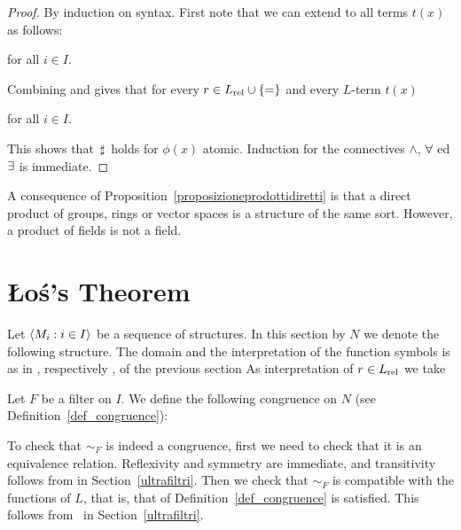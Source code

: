 \documentclass[creche.tex]{subfiles}
\begin{document}
\begin{proof}
By induction on syntax. First note that we can extend  to all terms $t(x)$ as follows:

\hfill  for all $i\in I$. 

Combining  and  gives that for every $r\in L_{\rm rel}\cup\{=\}$ and every $L$-term $t(x)$

\hfill  for all $i\in I$.

This shows that $\,\sharp\,$ holds for $\phi(x)$ atomic. Induction for the connectives $\wedge$, $\forall$ ed $\exists$ is immediate.
\end{proof}

A consequence of Proposition~\ref{proposizioneprodottidiretti} is that a direct product of groups, rings or vector spaces is a structure of the same sort. However, a product of fields is not a field.

\section{\L o\'{s}'s Theorem}
Let $\langle M_i:i\in I\rangle$ be a sequence of structures.
In this section by $N$ we denote the following structure.
The domain and the interpretation of the function symbols is as in , respectively , of the previous section
As interpretation of $r\in L_{\rm rel}$ we take


Let $F$ be a filter on $I$. We define the following congruence on $N$ (see Definition~\ref{def_congruence}):


To check that $\sim_F$ is indeed a congruence, first we need to check that it is an equivalence relation. Reflexivity and symmetry are immediate, and transitivity follows from  in Section~\ref{ultrafiltri}. Then we check that $\sim_F$ is compatible with the functions of $L$, that is, that  of Definition~\ref{def_congruence} is satisfied. This follows from~ in Section~\ref{ultrafiltri}.
\end{document}
